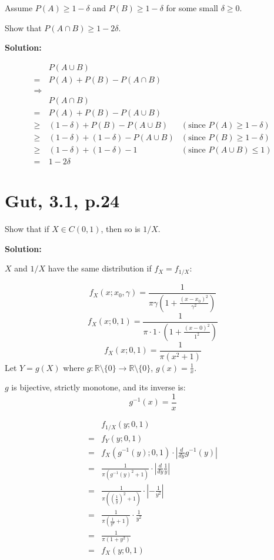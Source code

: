 \documentclass{article}
\begin{document}
Assume
\(P(A) \geq 1-\delta\) and \(P(B) \geq 1-\delta\) for some small \(\delta\geq0\).

Show that \(P(A\cap B) \geq 1-2\delta\).

\textbf{Solution:}

\begin{align*}
	 & P(A\cup B) \\
	=& P(A)+P(B)-P(A\cap B) \\
	\Rightarrow& \\
	 & P(A\cap B) \\
	=& P(A)+P(B)-P(A\cup B) \\
	\geq& (1-\delta)+P(B)-P(A\cup B) & (\text{since }P(A) \geq 1-\delta) \\
	\geq& (1-\delta)+(1-\delta)-P(A\cup B) & (\text{since }P(B) \geq 1-\delta) \\
	\geq& (1-\delta)+(1-\delta)-1 & (\text{since }P(A\cup B) \leq 1) \\
	=& 1-2\delta
\end{align*}

\section{Gut, 3.1, p.24}

Show that if \(X \in C(0,1)\), then so is \(1/X\).

\textbf{Solution:}

\(X\) and \(1/X\) have the same distribution if \(f_X=f_{1/X}\):

\[f_X(x;x_0,\gamma) = \frac{1}{\pi\gamma(1+\frac{(x-x_0)^2}{\gamma^2})}\]
\[f_X(x;0,1) = \frac{1}{\pi \cdot 1 \cdot (1+\frac{(x-0)^2}{1^2})}\]
\[f_X(x;0,1) = \frac{1}{\pi (x^2+1)}\]
Let \(Y=g(X)\) where \(g: \mathbb{R}\setminus\{0\}\to\mathbb{R}\setminus\{0\}\), \(g(x) = \frac{1}{x}\).

\(g\) is bijective, strictly monotone, and its inverse is:
\[g^{-1}(x) = \frac{1}{x}\]

\begin{align*}
 & f_{1/X}(y;0,1) \\
=& f_Y(y;0,1) \\
=& f_X(g^{-1}(y);0,1) \cdot |\frac{d}{dy}g^{-1}(y)| \\
=& \frac{1}{\pi (g^{-1}(y)^2+1)} \cdot |\frac{d}{dy}\frac{1}{y}| \\
=& \frac{1}{\pi ((\frac{1}{y})^2+1)} \cdot |-\frac{1}{y^2}| \\
=& \frac{1}{\pi (\frac{1}{y^2}+1)} \cdot \frac{1}{y^2} \\
=& \frac{1}{\pi (1+y^2)} \\
=& f_X(y;0,1) \\
\end{align*}
\end{document}
